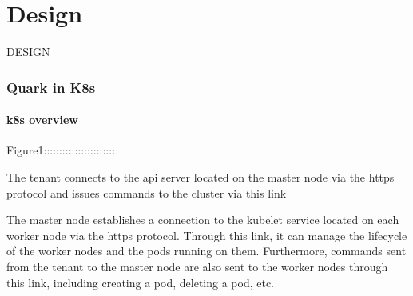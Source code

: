 \chapter{Design}
\label{sec:design}





DESIGN

\subsection{Quark in K8s}



\subsubsection{k8s overview}

    Figure1:::::::::::::::::::::::

    The tenant connects to the api server located on the master node via the https protocol and issues commands to the cluster via this link
    
    The master node establishes a connection to the kubelet service located on each worker node via the https protocol. Through this link, it can manage the lifecycle of the worker nodes and the pods running on them. Furthermore, commands sent from the tenant to the master node 
    are also sent to the worker nodes through this link, including creating a pod, deleting a pod, etc.
    
